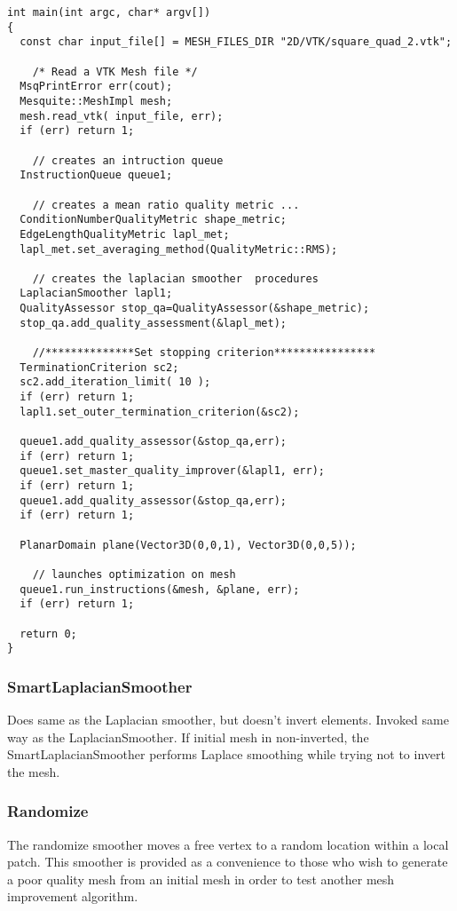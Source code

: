 \begin{lstlisting}[frame=single]
int main(int argc, char* argv[])
{
  const char input_file[] = MESH_FILES_DIR "2D/VTK/square_quad_2.vtk";

    /* Read a VTK Mesh file */
  MsqPrintError err(cout);
  Mesquite::MeshImpl mesh;
  mesh.read_vtk( input_file, err);
  if (err) return 1;
  
    // creates an intruction queue
  InstructionQueue queue1;
  
    // creates a mean ratio quality metric ...
  ConditionNumberQualityMetric shape_metric;
  EdgeLengthQualityMetric lapl_met;
  lapl_met.set_averaging_method(QualityMetric::RMS);
 
    // creates the laplacian smoother  procedures
  LaplacianSmoother lapl1;
  QualityAssessor stop_qa=QualityAssessor(&shape_metric);
  stop_qa.add_quality_assessment(&lapl_met);
  
    //**************Set stopping criterion****************
  TerminationCriterion sc2;
  sc2.add_iteration_limit( 10 );
  if (err) return 1;
  lapl1.set_outer_termination_criterion(&sc2);
  
  queue1.add_quality_assessor(&stop_qa,err); 
  if (err) return 1;
  queue1.set_master_quality_improver(&lapl1, err); 
  if (err) return 1;
  queue1.add_quality_assessor(&stop_qa,err); 
  if (err) return 1;
 
  PlanarDomain plane(Vector3D(0,0,1), Vector3D(0,0,5));
  
    // launches optimization on mesh
  queue1.run_instructions(&mesh, &plane, err); 
  if (err) return 1;

  return 0;
}
\end{lstlisting}

\subsubsection{SmartLaplacianSmoother}

Does same as the Laplacian smoother, but doesn't invert elements.  Invoked same way as the LaplacianSmoother.  If initial mesh in non-inverted, the SmartLaplacianSmoother performs Laplace smoothing while trying not to invert the mesh.

\subsubsection{Randomize}

The randomize smoother moves a free vertex to a random location within a local patch.  This smoother is provided as a convenience to
those who wish to generate a poor quality mesh from an initial mesh in order to test another mesh improvement algorithm.

